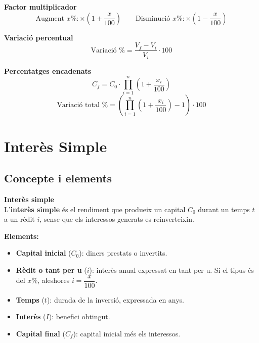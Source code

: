 \documentclass[12pt]{article}
\begin{document}
\begin{resum}[title=Resum 1: Percentatges]
\textbf{Factor multiplicador}
\[
\text{Augment } x\%: \times \left(1+\dfrac{x}{100}\right) \qquad
\text{Disminució } x\%: \times \left(1-\dfrac{x}{100}\right)
\]

\textbf{Variació percentual}
\[
\text{Variació \%} = \dfrac{V_f - V_i}{V_i} \cdot 100
\]

\textbf{Percentatges encadenats}
\[
C_f = C_0 \cdot \prod_{i=1}^{n} \left(1 + \dfrac{x_i}{100}\right)
\]
\[
\text{Variació total \%} = \left(\prod_{i=1}^{n}\left(1+\dfrac{x_i}{100}\right) - 1\right) \cdot 100
\]
\end{resum}

\newpage

\section{Interès Simple}

\subsection{Concepte i elements}

\begin{concept}
\textbf{Interès simple}\\
L'\textbf{interès simple} és el rendiment que produeix un capital $C_0$ durant un temps $t$ a un rèdit $i$, sense que els interessos generats es reinverteixin.

\textbf{Elements:}
\begin{itemize}
    \item \textbf{Capital inicial} ($C_0$): diners prestats o invertits.
    \item \textbf{Rèdit o tant per u} ($i$): interès anual expressat en tant per u. Si el tipus és del $x\%$, aleshores $i = \dfrac{x}{100}$.
    \item \textbf{Temps} ($t$): durada de la inversió, expressada en anys.
    \item \textbf{Interès} ($I$): benefici obtingut.
    \item \textbf{Capital final} ($C_f$): capital inicial més els interessos.
\end{itemize}
\end{concept}
\end{document}
